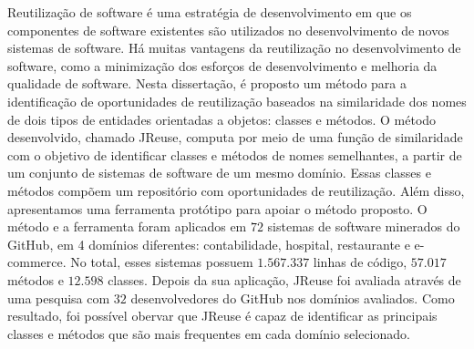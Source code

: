 Reutilização de software é uma estratégia de desenvolvimento em que os componentes de software existentes são utilizados no desenvolvimento de novos sistemas de software. Há muitas vantagens da reutilização no desenvolvimento de software, como a minimização dos esforços de desenvolvimento e melhoria da qualidade de software. %
Nesta dissertação, é proposto um método para a identificação de oportunidades de reutilização baseados na similaridade dos nomes de dois tipos de entidades orientadas a objetos: classes e métodos. O método desenvolvido, chamado JReuse, computa por meio de uma função de similaridade com o objetivo de identificar classes e métodos de nomes semelhantes, a partir de um conjunto de sistemas de software de um mesmo domínio. Essas classes e métodos compõem um repositório com oportunidades de reutilização. Além disso, apresentamos uma ferramenta protótipo para apoiar o método proposto. O método e a ferramenta foram aplicados em $72$ sistemas de software minerados do GitHub, em 4 domínios diferentes: contabilidade, hospital, restaurante e e-commerce. No total, esses sistemas possuem $1.567.337$ linhas de código, $57.017$ métodos e $12.598$ classes. Depois da sua aplicação, JReuse foi avaliada através de uma pesquisa com $32$ desenvolvedores do GitHub nos domínios avaliados. Como resultado, foi possível obervar que JReuse é capaz de identificar as principais classes e métodos que são mais frequentes em cada domínio selecionado.	

